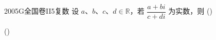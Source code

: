 
\begin{problem}{2005}{G}{全国卷II}{5}{复数}
设 $ a $、$ b $、$ c $、$ d\in\mathbb{R} $，若 $ \dfrac{a+bi}{c+di} $ 为实数，则 (\hspace{1cm})

(\hspace{1cm})
\begin{choices}
\end{choices}
\end{problem}

\begin{answer}

\end{answer}

\begin{solutions}

\end{solutions}